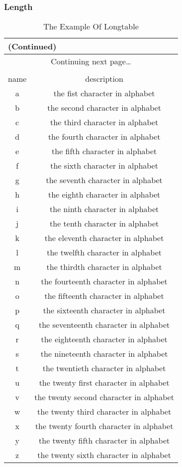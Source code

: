 \subsubsection{Length}
\begin{longtable}[c]{|c|c|}         %
    \caption{The Example Of Longtable} \\
    \hline
    \endfirsthead

    \multicolumn{2}{l}{ (Continued) } \\
    \hline
    \endhead

    \multicolumn{2}{c}{Continuing next page\ldots} \\[2ex]
    \endfoot

    \hline
    \multicolumn{2}{r}{End Of Table} \\
    \endlastfoot

    name & description \\ \hline
    a & the fist character in alphabet \\
    b & the second character in alphabet \\
    c & the third character in alphabet \\
    d & the fourth character in alphabet \\
    e & the fifth character in alphabet \\
    f & the sixth character in alphabet \\
    g & the seventh character in alphabet \\
    h & the eighth character in alphabet \\
    i & the ninth character in alphabet \\
    j & the tenth character in alphabet \\
    k & the eleventh character in alphabet \\
    l & the twelfth character in alphabet \\
    m & the thirdth character in alphabet \\
    n & the fourteenth character in alphabet \\
    o & the fifteenth character in alphabet \\
    p & the sixteenth character in alphabet \\
    q & the seventeenth character in alphabet \\
    r & the eighteenth character in alphabet \\
    s & the nineteenth character in alphabet \\
    t & the twentieth character in alphabet \\
    u & the twenty first character in alphabet \\
    v & the twenty second character in alphabet \\
    w & the twenty third character in alphabet \\
    x & the twenty fourth character in alphabet \\
    y & the twenty fifth character in alphabet \\
    z & the twenty sixth character in alphabet \\
\end{longtable}

